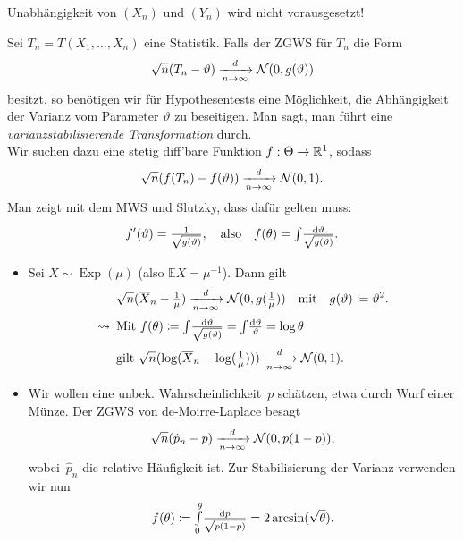\documentclass{cheat-sheet}
\newcommand{\E}{\mathbb{E}} %
\newcommand{\Normal}{\mathcal{N}} %
\DeclareMathOperator{\Exp}{Exp} %
\begin{document}
\begin{bem}
  Unabhängigkeit von $(X_n)$ und $(Y_n)$ wird nicht vorausgesetzt!
\end{bem}



\begin{situation}
  Sei $T_n = T(X_1, \ldots, X_n)$ eine Statistik.
  Falls der ZGWS für $T_n$ die Form
  \[ \sqrt{n} (T_n - \vartheta) \xra[n \to \infty]{d} \Normal(0, g(\vartheta)) \]
  besitzt, so benötigen wir für Hypothesentests eine Möglichkeit, die Abhängigkeit der Varianz vom Parameter $\vartheta$ zu beseitigen.
  Man sagt, man führt eine \emph{varianzstabilisierende Transformation} durch. \\
  Wir suchen dazu eine stetig diff'bare Funktion $f : \Theta \to \mathbb{R}^1$, sodass
  \[ \sqrt{n} (f(T_n) - f(\vartheta)) \xra[n \to \infty]{d} \Normal(0, 1). \]
  Man zeigt mit dem MWS und Slutzky, dass dafür gelten muss:
  \[
    f'(\vartheta) = \tfrac{1}{\sqrt{g(\vartheta)}}, \quad \text{also} \quad
    f(\theta) = {\textstyle \int\limits_{}^{}} \tfrac{\mathrm{d} \vartheta}{\sqrt{g(\vartheta)}}.
  \]
\end{situation}

\begin{bspe}
  \begin{itemize}
    \item Sei $X \sim \Exp(\mu)$ (also $\E X = \mu^{-1}$).
    Dann gilt
    \begin{align*}
      & \sqrt{n} (\overline{X}_n - \tfrac{1}{\mu}) \xra[n \to \infty]{d} \Normal(0, g(\tfrac{1}{\mu}))
      \quad \text{mit} \quad
      g(\vartheta) \coloneqq \vartheta^2. \\
      \leadsto \enspace & \text{Mit } f(\theta) \coloneqq \myint{}{} \tfrac{\d \vartheta}{\sqrt{g(\vartheta)}} = \myint{}{} \tfrac{\d \vartheta}{\vartheta} = \log \theta \\
      & \text{gilt } \sqrt{n} (\log(\overline{X}_n - \log(\tfrac{1}{\mu}))) \xra[n \to \infty]{d} \Normal(0, 1).
    \end{align*}
    \item Wir wollen eine unbek. Wahrscheinlichkeit~$p$ schätzen, etwa durch Wurf einer Münze.
    Der ZGWS von de-Moirre-Laplace besagt
    \[ \sqrt{n} ( \hat{p}_n - p) \xra[n \to \infty]{d} \Normal(0, p (1-p)), \]
    wobei~$\hat{p}_n$ die relative Häufigkeit ist.
    Zur Stabilisierung der Varianz verwenden wir nun
    \[ f(\theta) \coloneqq {\textstyle \int\limits_{0}^{\theta}} \tfrac{\mathrm{d} p}{\sqrt{p (1-p)}} = 2 \arcsin(\sqrt{\theta}). \]
  \end{itemize}
\end{bspe}
\end{document}
